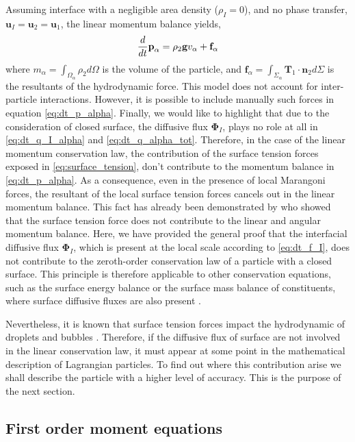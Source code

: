 Assuming interface with a negligible area density ($\rho_I=0$), and no phase transfer, $\textbf{u}_I=\textbf{u}_2=\textbf{u}_1$, the linear momentum balance yields, 
\begin{equation}
    \frac{d}{d t} \textbf{p}_\alpha
    = 
    \rho_2\textbf{g}v_\alpha
    + \textbf{f}_\alpha
    \label{eq:dt_p_alpha}
\end{equation}
where $m_\alpha = \int_{\Omega_\alpha}\rho_2 d\Omega$ is the volume of the particle, and $\textbf{f}_\alpha = \int_{\Sigma_\alpha}  \textbf{T}_1 \cdot \textbf{n}_2 d\Sigma$ is the resultants of the hydrodynamic force. 
This model does not account for inter-particle interactions. 
However, it is possible to include manually such forces in equation \ref{eq:dt_p_alpha}.
Finally, we would like to highlight that  due to the consideration of closed surface, the diffusive flux $\mathbf{\Phi}_I$, plays no role at all in \ref{eq:dt_q_I_alpha} and \ref{eq:dt_q_alpha_tot}.
Therefore, in the case of the linear momentum conservation law, the contribution of the surface tension forces exposed in \ref{eq:surface_tension}, don't contribute to the momentum balance in \ref{eq:dt_p_alpha}.
As a consequence, even in the presence of local Marangoni forces, the resultant of the local surface tension forces cancels out in the linear momentum balance.
This fact has already been demonstrated by \citet{hesla1993note} who showed that the surface tension force does not contribute to the linear and angular momentum balance. 
Here, we have provided the general proof that the interfacial diffusive flux $\mathbf{\Phi}_I$, which is present at the local scale according to \ref{eq:dt_f_I}, does not contribute to the zeroth-order conservation law of a particle with a closed surface.
This principle is therefore applicable to other conservation equations, such as the surface energy balance or the surface mass balance of constituents, where surface diffusive fluxes are also present \citep{bothe2022sharp}. 

Nevertheless, it is known that surface tension forces impact the hydrodynamic of droplets and bubbles \citep{kentheswaran2022direct,pesci2018computational}. 
Therefore, if the diffusive flux of surface are not involved in the linear conservation law, it must appear at some point in the mathematical description of Lagrangian particles. 
To find out where this contribution arise we shall describe the particle with a higher level of accuracy. 
This is the purpose of the next section. 

\subsection{First order moment equations}


